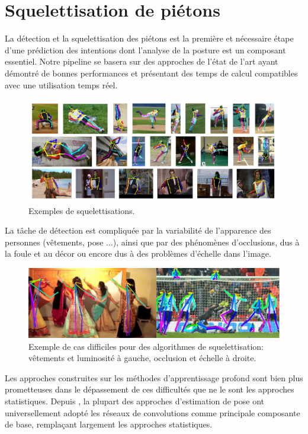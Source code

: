 \chapter{Squelettisation de piétons}
\label{ch:chapter1}
La détection et la squelettisation des piétons est la première et nécessaire étape d'une prédiction des intentions dont l'analyse de la posture est un composant essentiel.
Notre pipeline se basera sur des approches de l’état de l’art ayant démontré de bonnes performances et présentant
des temps de calcul compatibles avec une utilisation temps réel.


\begin{figure}[H]
    \centering
    \includegraphics[width=0.9\linewidth]{Images/pose_estim_example.png}
    \caption{Exemples de squelettisations.}
    \label{fig:difficulte}
\end{figure}


La tâche de détection est compliquée par la variabilité de l’apparence des personnes (vêtements, pose ...), ainsi que par des phénomènes d’occlusions, dus à la foule et au décor ou encore dus à des problèmes d'échelle dans l'image.\\


\begin{figure}[H]
    \centering
    \includegraphics[width=0.85\linewidth]{Images/Difficulties.png}
    \caption{Exemple de cas difficiles pour des algorithmes de squelettisation: vêtements et luminosité à gauche, occlusion et échelle à droite.}
    \label{fig:difficulte}
\end{figure}
Les approches construites sur les méthodes d'apprentissage profond sont bien plus prometteuses dans le dépassement de ces difficultés que ne le sont les approches statistiques. Depuis \cite{toshev2014deeppose}, la plupart des approches d'estimation de pose ont universellement adopté les réseaux de convolutions comme principale composante de base, remplaçant largement les approches statistiques.\\



